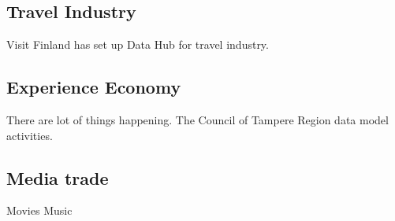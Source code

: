 \subsection{Travel Industry}\label{travel_industry}

Visit Finland has set up Data Hub\allowbreak\cite{TravelIndustryDataHub}
for travel industry\allowbreak\cite{Amadeus}.

\subsection{Experience Economy}\label{experience_economy}

There are lot of things happening. The Council of Tampere Region data model
activities\allowbreak\cite{EAKR_AKKE_Pirkanmaa_2026_01_16}.

\subsection{Media trade}\label{media_trade}
Movies\allowbreak\cite{IMDb}
Music



